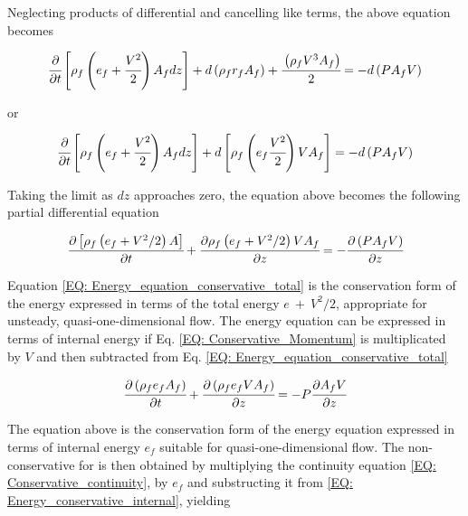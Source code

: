 \documentclass[../Article_Model_Parameters.tex]{subfiles}
\begin{document}
	Neglecting products of differential and cancelling like terms, the above equation becomes
	
	{\footnotesize
		\begin{equation}
			\cfrac{\partial}{\partial t} \left[ \rho_f \left( e_f + \cfrac{V^2}{2} \right) A_f dz \right] + d\left( \rho_f r_f A_f \right) + \cfrac{ \left( \rho_f V^3 A_f \right) }{2} = -d \left( P A_f V \right)
		\end{equation}
	}

	or
	
	{\footnotesize
		\begin{equation}
			\cfrac{\partial}{\partial t} \left[ \rho_f \left( e_f + \cfrac{V^2}{2} \right) A_f dz \right] + d \left[ \rho_f \left( e_f \cfrac{V^2}{2} \right) VA_f \right] = - d\left( P A_f V \right)
		\end{equation}
	}

	Taking the limit as $dz$ approaches zero, the equation above becomes the following partial differential equation
	
	{\footnotesize
		\begin{equation}
			\cfrac{\partial \left[ \rho_f \left( e_f + V^2 / 2 \right) A \right]}{\partial t} + \cfrac{\partial \rho_f \left( e_f + V^2 / 2 \right)VA_f}{\partial z} = -\cfrac{\partial \left( P A_f V \right)}{\partial z}
			\label{EQ: Energy_equation_conservative_total}
		\end{equation}
	}
	
	Equation \ref{EQ: Energy_equation_conservative_total} is the conservation form of the energy expressed in terms of the total energy $e~+~V^2/2$, appropriate for unsteady, quasi-one-dimensional flow. The energy equation can be expressed in terms of internal energy if Eq. \ref{EQ: Conservative_Momentum} is multiplicated by $V$ and then subtracted from Eq. \ref{EQ: Energy_equation_conservative_total}
	
	{\footnotesize
		\begin{equation}
			\cfrac{\partial \left( \rho_f e_f A_f \right) }{\partial t} + \cfrac{\partial \left( \rho_f  e_f V A_f \right)}{\partial z} = -P \cfrac{\partial A_f V}{\partial z}
			\label{EQ: Energy_conservative_internal}
		\end{equation}
	}
	
	The equation above is the conservation form of the energy equation expressed in terms of internal energy $e_f$ suitable for quasi-one-dimensional flow. The non-conservative for is then obtained by multiplying the continuity equation \ref{EQ: Conservative_continuity}, by $e_f$ and substructing it from \ref{EQ: Energy_conservative_internal}, yielding 
	
\end{document}
